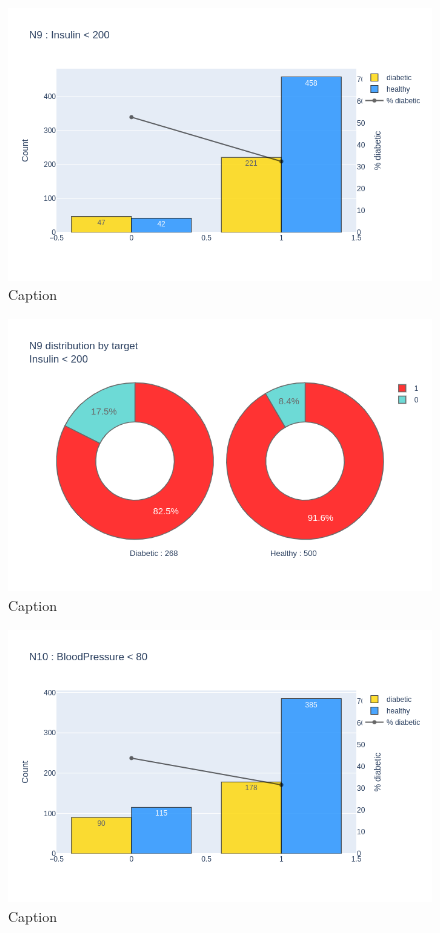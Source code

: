 \documentclass[12pt]{article}
\begin{document}
\begin{figure}[ht]
\centering
\includegraphics[width=1\textwidth]{newplot(32).png}
\caption{\label{fig:41} Caption}
\end{figure}

\begin{figure}[ht]
\centering
\includegraphics[width=1\textwidth]{newplot(33).png}
\caption{\label{fig:42} Caption}
\end{figure}

\begin{figure}[ht]
\centering
\includegraphics[width=1\textwidth]{newplot(34).png}
\caption{\label{fig:43} Caption}
\end{figure}
\end{document}
